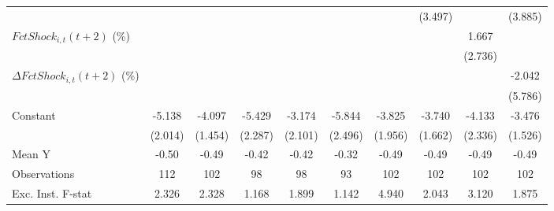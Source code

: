 {\begin{tabular}{l*{9}{c}}
                    &                     &                     &                     &                     &                     &                     &     (3.497)         &                     &     (3.885)         \\
\addlinespace
$ FctShock_{i,t}(t+2)$ (\%)&                     &                     &                     &                     &                     &                     &                     &       1.667         &                     \\
                    &                     &                     &                     &                     &                     &                     &                     &     (2.736)         &                     \\
\addlinespace
$ \Delta FctShock_{i,t}(t+2)$ (\%)&                     &                     &                     &                     &                     &                     &                     &                     &      -2.042         \\
                    &                     &                     &                     &                     &                     &                     &                     &                     &     (5.786)         \\
\addlinespace
Constant            &      -5.138\sym{**} &      -4.097\sym{**} &      -5.429\sym{**} &      -3.174         &      -5.844\sym{**} &      -3.825\sym{*}  &      -3.740\sym{**} &      -4.133         &      -3.476\sym{**} \\
                    &     (2.014)         &     (1.454)         &     (2.287)         &     (2.101)         &     (2.496)         &     (1.956)         &     (1.662)         &     (2.336)         &     (1.526)         \\
\midrule
Mean Y              &       -0.50         &       -0.49         &       -0.42         &       -0.42         &       -0.32         &       -0.49         &       -0.49         &       -0.49         &       -0.49         \\
Observations        &         112         &         102         &          98         &          98         &          93         &         102         &         102         &         102         &         102         \\
Exc. Inst. F-stat   &       2.326         &       2.328         &       1.168         &       1.899         &       1.142         &       4.940         &       2.043         &       3.120         &       1.875         \\
\bottomrule
\end{tabular}
}

